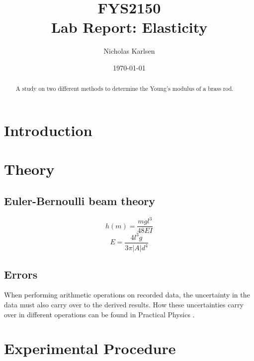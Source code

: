 \documentclass[%
 reprint,
 amsmath,amssymb,
 aps,
]{revtex4-1}
\begin{document}

\title{FYS2150 \\ Lab Report: Elasticity}%

\author{Nicholas Karlsen}

\date{\today}%

\begin{abstract}
    A study on two different methods to determine the Young's modulus of a brass rod.
\end{abstract}

\maketitle


\section{\label{sect:intro}Introduction}
    
\section{\label{sect:theory}Theory}
  \subsection{Euler-Bernoulli beam theory}
  \begin{equation}
    h(m) = \frac{mgl^3}{48EI}
  \end{equation}
  \begin{equation}
    E = \frac{4l^3g}{3\pi |A|d^4}
  \end{equation}
  \subsection{Errors}
    When performing arithmetic operations on recorded data, the uncertainty in the data must also carry over to the derived results. How these uncertainties carry over in different operations can be found in Practical Physics \cite{squires}.

\section{\label{section:experimental}Experimental Procedure}
\end{document}
